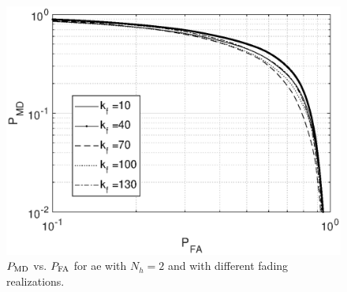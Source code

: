 \documentclass[draftcls,onecolumn,12pt]{IEEEtran}
\begin{document}
\begin{figure}
    \centering
    \includegraphics[width=0.5\columnwidth]{res_avg_nFading_oneClass.eps}
    \caption{$P_{\rm MD}$ vs. $P_{\rm FA}$ for \ac{ae} with $N_h = 2$ and with different fading realizations.}
    \label{fig:faded}
\end{figure}
\newpage 



%
%
\renewcommand*{\bibfont}{\footnotesize}

\printbibliography
\end{document}
